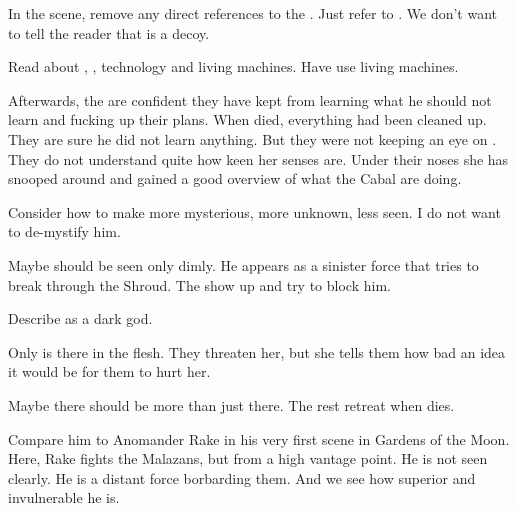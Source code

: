\begin{changes}
    
    \begin{comment}
      \subparagraph{Psyrex}
    \end{comment}
    In the \Psyrex{} scene, remove any direct references to the \Malcur \nexus. 
    Just refer to . 
    We don't want to tell the reader that \Forclin{} is a decoy. 

    Read about \Psyrex, \dragons, technology and living machines. 
    Have \Psyrex use living machines. 
    
    \begin{comment}
      \subparagraph{Resphain}
    \end{comment}
    Afterwards, the \resphain are confident they have kept \Ishnaruchaefir from learning what he should not learn and fucking up their plans. 
    When \Teshrial died, everything had been cleaned up.
    They are sure he did not learn anything.
    But they were not keeping an eye on \Criseis.
    They do not understand quite how keen her senses are.
    Under their noses she has snooped around and gained a good overview of what the Cabal are doing. 
  
  \begin{comment}\paragraph{What Slithers Beneath: New variant}\end{comment}
  
    \begin{comment}
      \subparagraph{Main idea}
    \end{comment}
    Consider how to make \Ishnaruchaefir more mysterious, more unknown, less seen. 
    I do not want to de-mystify him. 
    
    Maybe \Ishnaruchaefir should be seen only dimly.
    He appears as a sinister force that tries to break through the Shroud.
    The \resphain show up and try to block him.
    
    Describe \Ishnaruchaefir as a dark \draconian god. 
    
    Only \Criseis is there in the flesh. 
    They threaten her, but she tells them how bad an idea it would be for them to hurt her. 
    
    Maybe there should be more \resphain than just \Teshrial there.
    The rest retreat when \Teshrial dies. 

    Compare him to Anomander Rake in his very first scene in Gardens of the Moon. 
    Here, Rake fights the Malazans, but from a high vantage point. 
    He is not seen clearly. 
    He is a distant force borbarding them. 
    And we see how superior and invulnerable he is.
  

\end{changes}

